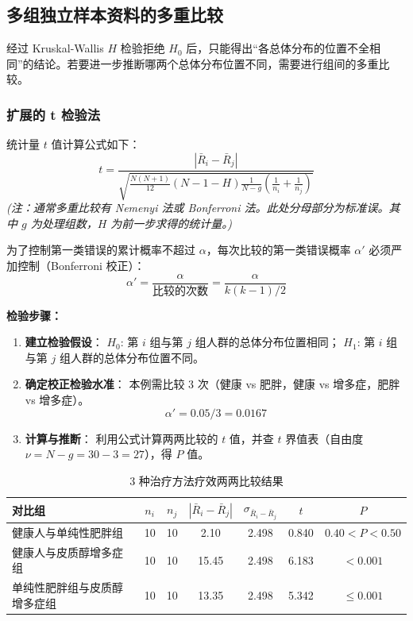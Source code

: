 \documentclass[lang=cn,10pt]{elegantbook}
\begin{document}
\subsection{多组独立样本资料的多重比较}

经过 Kruskal-Wallis $H$ 检验拒绝 $H_0$ 后，只能得出“各总体分布的位置不全相同”的结论。若要进一步推断哪两个总体分布位置不同，需要进行组间的多重比较。

\subsubsection{扩展的 t 检验法}
统计量 $t$ 值计算公式如下：
\[
t = \frac{|\bar{R}_i - \bar{R}_j|}{\sqrt{\frac{N(N+1)}{12}(N-1-H) \frac{1}{N-g} (\frac{1}{n_i} + \frac{1}{n_j}) }}
\]
\textit{(注：通常多重比较有 Nemenyi 法或 Bonferroni 法。此处分母部分为标准误。其中 $g$ 为处理组数，$H$ 为前一步求得的统计量。)}

为了控制第一类错误的累计概率不超过 $\alpha$，每次比较的第一类错误概率 $\alpha'$ 必须严加控制（Bonferroni 校正）：
\[
\alpha' = \frac{\alpha}{\text{比较的次数}} = \frac{\alpha}{k(k-1)/2}
\]

\textbf{检验步骤：}
\begin{enumerate}
    \item \textbf{建立检验假设}：
    $H_0$: 第 $i$ 组与第 $j$ 组人群的总体分布位置相同；
    $H_1$: 第 $i$ 组与第 $j$ 组人群的总体分布位置不同。
    \item \textbf{确定校正检验水准}：
    本例需比较 3 次（健康 vs 肥胖，健康 vs 增多症，肥胖 vs 增多症）。
    \[
    \alpha' = 0.05 / 3 = 0.0167
    \]
    \item \textbf{计算与推断}：
    利用公式计算两两比较的 $t$ 值，并查 $t$ 界值表（自由度 $\nu = N-g = 30-3 = 27$），得 $P$ 值。
\end{enumerate}

\begin{table}[htbp]
\centering
\caption{3 种治疗方法疗效两两比较结果}
\begin{tabular}{lcccccc}
\toprule
对比组 & $n_i$ & $n_j$ & $|\bar{R}_i - \bar{R}_j|$ & $\sigma_{\bar{R}_i - \bar{R}_j}$ & $t$ & $P$ \\
\midrule
健康人与单纯性肥胖组 & 10 & 10 & 2.10 & 2.498 & 0.840 & $0.40 < P < 0.50$ \\
健康人与皮质醇增多症组 & 10 & 10 & 15.45 & 2.498 & 6.183 & $< 0.001$ \\
单纯性肥胖组与皮质醇增多症组 & 10 & 10 & 13.35 & 2.498 & 5.342 & $\le 0.001$ \\
\bottomrule
\end{tabular}
\end{table}
\end{document}
